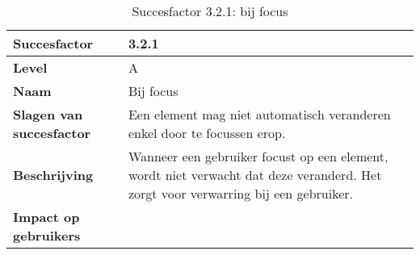\begin{table}[H]
    \centering
    \caption{Succesfactor 3.2.1: bij focus}
    
    
    \hspace*{-1cm}\begin{tabular}{|l|p{12cm}|} 
        \hline
        \textbf{Succesfactor}                 & 3.2.1                                                                                                                                                                                                                                                                                                                                                                                                                                                                                                        \\ 
        \hline
        \textbf{Level}                        & A                                                                                                                                                                                                                                                                                                                                                                                                                                                                                                               \\ 
        \hline
        \textbf{Naam}                         & Bij focus~                                                                                                                                                                                                                                                                                                                                                                                                                                                                                      \\ 
        \hline
        \textbf{Slagen van succesfactor}      & Een element mag niet automatisch veranderen enkel door te focussen erop. 
        \\  
        \hline
        \textbf{Beschrijving}                 & Wanneer een gebruiker focust op een element, wordt niet verwacht dat deze veranderd. Het zorgt voor verwarring bij een gebruiker.   \\ 
        \hline
        \textbf{Impact op gebruikers}         &  
        \begin{itemize}

\end{itemize}
\end{tabular}
\end{table}
